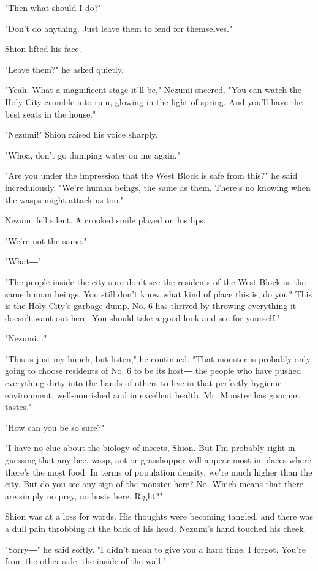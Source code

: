 "Then what should I do?"

"Don't do anything. Just leave them to fend for themselves."

Shion lifted his face.

"Leave them?" he asked quietly.

"Yeah. What a magnificent stage it'll be," Nezumi sneered. "You can
watch the Holy City crumble into ruin, glowing in the light of spring.
And you'll have the best seats in the house."

"Nezumi!" Shion raised his voice sharply.

"Whoa, don't go dumping water on me again."

"Are you under the impression that the West Block is safe from this?" he
said incredulously. "We're human beings, the same as them. There's no
knowing when the wasps might attack us too."

Nezumi fell silent. A crooked smile played on his lips.

"We're not the same."

"What―"

"The people inside the city sure don't see the residents of the West
Block as the same human beings. You still don't know what kind of place
this is, do you? This is the Holy City's garbage dump. No. 6 has thrived
by throwing everything it doesn't want out here. You should take a good
look and see for yourself."

"Nezumi..."

"This is just my hunch, but listen," he continued. "That monster is
probably only going to choose residents of No. 6 to be its host― the
people who have pushed everything dirty into the hands of others to live
in that perfectly hygienic environment, well-nourished and in excellent
health. Mr. Monster has gourmet tastes."

"How can you be so sure?"

"I have no clue about the biology of insects, Shion. But I'm probably
right in guessing that any bee, wasp, ant or grasshopper will appear
most in places where there's the most food. In terms of population
density, we're much higher than the city. But do you see any sign of the
monster here? No. Which means that there are simply no prey, no hosts
here. Right?"

Shion was at a loss for words. His thoughts were becoming tangled, and
there was a dull pain throbbing at the back of his head. Nezumi's hand
touched his cheek.

"Sorry―" he said softly. "I didn't mean to give you a hard time. I
forgot. You're from the other side, the inside of the wall."

